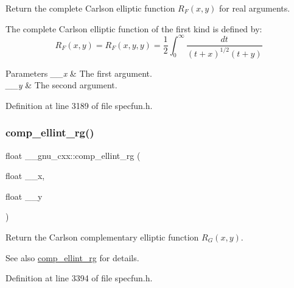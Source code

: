 Return the complete Carlson elliptic function $ R_F(x,y) $ for real arguments.

The complete Carlson elliptic function of the first kind is defined by\+: \[ R_F(x,y) = R_F(x,y,y) = \frac{1}{2} \int_0^\infty \frac{dt}{(t + x)^{1/2}(t + y)} \]


\begin{DoxyParams}{Parameters}
{\em \+\_\+\+\_\+x} & The first argument. \\
\hline
{\em \+\_\+\+\_\+y} & The second argument. \\
\hline
\end{DoxyParams}


Definition at line 3189 of file specfun.\+h.

\mbox{\label{group__gnu__math__spec__func_ga978f8eec6e5edc918b243925dbacb65b}} 
\subsubsection{\texorpdfstring{comp\+\_\+ellint\+\_\+rg()}{comp\_ellint\_rg()}\hspace{0.1cm}{\footnotesize\ttfamily [1/3]}}
{\footnotesize\ttfamily float \+\_\+\+\_\+gnu\+\_\+cxx\+::comp\+\_\+ellint\+\_\+rg (\begin{DoxyParamCaption}\item[{float}]{\+\_\+\+\_\+x,  }\item[{float}]{\+\_\+\+\_\+y }\end{DoxyParamCaption})\hspace{0.3cm}{\ttfamily [inline]}}

Return the Carlson complementary elliptic function $ R_G(x,y) $.

\begin{DoxySeeAlso}{See also}
\hyperlink{group__gnu__math__spec__func_ga978f8eec6e5edc918b243925dbacb65b}{comp\+\_\+ellint\+\_\+rg} for details. 
\end{DoxySeeAlso}


Definition at line 3394 of file specfun.\+h.

\mbox{\label{group__gnu__math__spec__func_gaca5fa8ee8125afc8f35ec6b27806e873}} 
